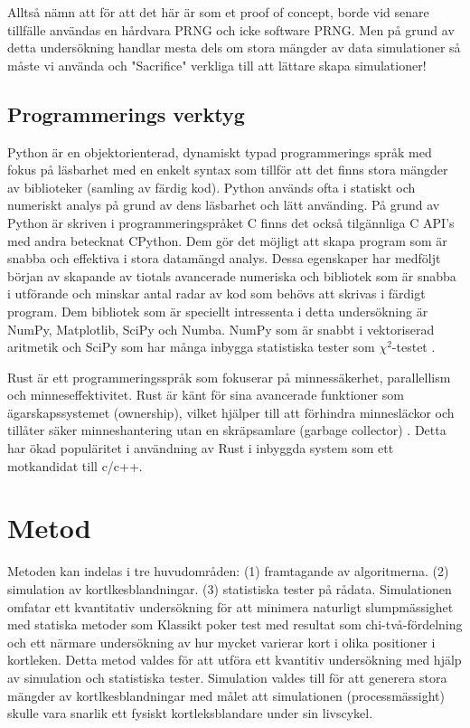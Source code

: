 \documentclass[swedish,a4paper]{article}
\begin{document}
Alltså nämn att för att det här är som et proof of concept, borde vid
senare tillfälle användas en hårdvara PRNG och icke software PRNG.
Men på grund av detta undersökning handlar mesta dels om stora mängder av data
simulationer så måste vi använda och "Sacrifice" verkliga till att lättare
skapa simulationer!
\subsection{Programmerings verktyg}
Python är en objektorienterad, dynamiskt typad programmerings språk med
fokus på läsbarhet med en enkelt syntax som tillför att det finns stora
mängder av biblioteker (samling av färdig kod).
Python används ofta i statiskt och numeriskt analys på grund av dens
läsbarhet och lätt använding. På grund av Python är skriven i
programmeringspråket C finns det också tilgännliga C API's med andra
betecknat CPython. Dem gör det möjligt att skapa program som är snabba
och effektiva i stora datamängd analys. Dessa egenskaper har medföljt
början av skapande av tiotals avancerade numeriska och
bibliotek som är snabba i utförande och minskar antal radar av kod som
behövs att skrivas i färdigt program. Dem bibliotek som är speciellt
intressenta i detta undersökning är NumPy, Matplotlib, SciPy och Numba.
NumPy som är snabbt i vektoriserad aritmetik och SciPy som har många
inbygga statistiska tester som $\chi^2$-testet \parencite{numpy, scipy}.

Rust är ett programmeringsspråk som fokuserar på
minnessäkerhet, parallellism och minneseffektivitet. Rust är känt för
sina avancerade funktioner som ägarskapssystemet (ownership), vilket
hjälper till att förhindra minnesläckor och tillåter säker
minneshantering utan en skräpsamlare (garbage collector)
\parencite{rust}. Detta har ökad populäritet i användning av Rust i
inbyggda system som ett motkandidat till c/c++. 

\section{Metod} 
Metoden kan indelas i tre huvudområden:
(1) framtagande av algoritmerna. 
(2) simulation av kortlkesblandningar. 
(3) statistiska tester på rådata.
Simulationen omfatar ett kvantitativ undersökning för att minimera
naturligt slumpmässighet med statiska metoder som Klassikt poker test
med resultat som chi-två-fördelning och ett närmare undersökning av hur
mycket varierar kort i olika positioner i kortleken.
Detta metod valdes för att utföra ett kvantitiv undersökning med
hjälp av simulation och statistiska tester. Simulation valdes till för
att generera stora mängder av kortlkesblandningar med målet att
simulationen (processmässight) skulle vara snarlik ett fysiskt
kortleks\-blandare under sin livscykel. 
\end{document}
